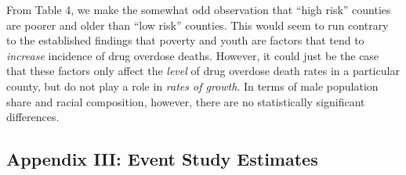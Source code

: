 \documentclass[
  11pt,
]{article}
\begin{document}
From Table 4, we make the somewhat odd observation that ``high risk''
counties are poorer and older than ``low risk'' counties. This would
seem to run contrary to the established findings that poverty and youth
are factors that tend to \emph{increase} incidence of drug overdose
deaths. However, it could just be the case that these factors only
affect the \emph{level} of drug overdose death rates in a particular
county, but do not play a role in \emph{rates of growth}. In terms of
male population share and racial composition, however, there are no
statistically significant differences.

\newpage

\hypertarget{appendix-iii-event-study-estimates}{%
\subsection{Appendix III: Event Study
Estimates}\label{appendix-iii-event-study-estimates}}
\end{document}
